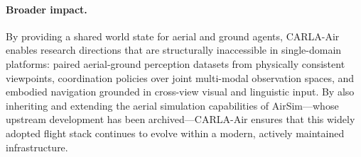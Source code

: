 \paragraph{Broader impact.}
By providing a shared world state for aerial and ground agents, CARLA-Air
enables research directions that are structurally inaccessible in single-domain
platforms: paired aerial-ground perception datasets from physically consistent
viewpoints, coordination policies over joint multi-modal observation spaces,
and embodied navigation grounded in cross-view visual and linguistic input.
By also inheriting and extending the aerial simulation capabilities of
AirSim---whose upstream development has been archived---CARLA-Air ensures that
this widely adopted flight stack continues to evolve within a modern, actively
maintained infrastructure.
